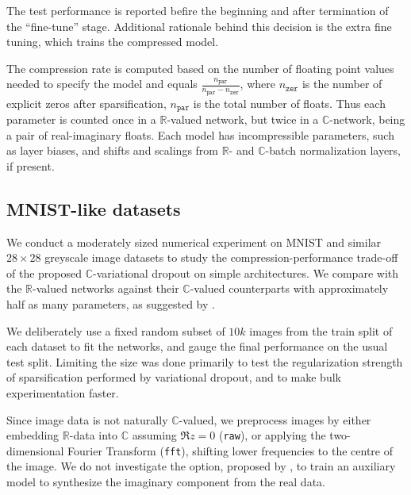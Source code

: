 \documentclass[a4paper,10pt]{article}
\newcommand{\real}{\mathbb{R}}
\newcommand{\cplx}{\mathbb{C}}
\begin{document}
The test performance is reported befire the beginning and after termination of the ``fine-tune''
stage. Additional rationale behind this decision is the extra fine tuning, which trains the
compressed model.


The compression rate is computed based on the number of floating point values needed
to specify the model and equals $
  \frac{n_\mathtt{par}}{n_\mathtt{par} - n_\mathtt{zer}}
$, where $n_\mathtt{zer}$ is the number of explicit zeros after sparsification, $n_\mathtt{par}$
is the total number of floats. Thus each parameter is counted once in a $\real$-valued
network, but twice in a $\cplx$-network, being a pair of real-imaginary floats. Each model
has incompressible parameters, such as layer biases, and shifts and scalings from $\real$-
and $\cplx$-batch normalization layers, if present.



\subsection{MNIST-like datasets} %
\label{sub:mnist_like_datasets}

We conduct a moderately sized numerical experiment on MNIST and similar $28\times 28$
greyscale image datasets to study the compression-performance trade-off of the proposed
$\cplx$-variational dropout on simple architectures. We compare with the $\real$-valued
networks against their $\cplx$-valued counterparts with approximately half as many
parameters, as suggested by \citet{monning_evaluation_2018}.

We deliberately use a {fixed} random subset of $10k$ images from the train split of each
dataset to fit the networks, and gauge the final performance on the usual test split.
Limiting the size was done primarily to test the regularization strength of sparsification
performed by variational dropout, and to make bulk experimentation faster.

Since image data is not naturally $\cplx$-valued, we preprocess images by either embedding
$\real$-data into $\cplx$ assuming $\Re z = 0$ (\texttt{raw}), or applying the two-dimensional
Fourier Transform (\texttt{fft}), shifting lower frequencies to the centre of the image. We
do not investigate the option, proposed by \citet{trabelsi_deep_2017}, to train an auxiliary
model to synthesize the imaginary component from the real data.
\end{document}
